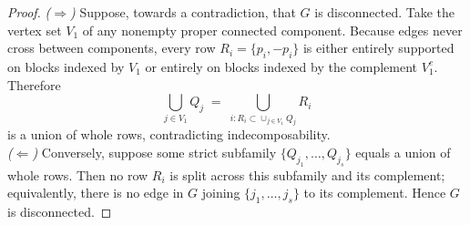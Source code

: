 \documentclass[10pt,a4paper]{amsart}
\begin{document}
\begin{proof}
\emph{($\Rightarrow$)} Suppose, towards a contradiction, that $G$ is disconnected. Take the vertex set $V_1$ of any nonempty proper connected component. Because edges never cross between components, every row $R_i=\{p_i,-p_i\}$ is either entirely supported on blocks indexed by $V_1$ or entirely on blocks indexed by the complement $V_1^c$. Therefore
\[
\bigcup_{j\in V_1} Q_j \;=\; \bigcup_{i: R_i\subset \cup_{j\in V_1}Q_j} R_i
\]
is a union of whole rows, contradicting indecomposability.\\


\emph{($\Leftarrow$)} Conversely, suppose some strict subfamily $\{Q_{j_1},\dots,Q_{j_s}\}$ equals a union of whole rows. Then no row $R_i$ is split across this subfamily and its complement; equivalently, there is no edge in $G$ joining $\{j_1,\dots,j_s\}$ to its complement. Hence $G$ is disconnected.
\end{proof}
\end{document}
